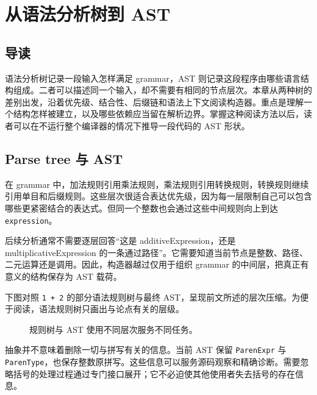 \chapter{从语法分析树到 AST}
\label{chap:front-builder}

\section*{导读}
语法分析树记录一段输入怎样满足 grammar，AST 则记录这段程序由哪些语言结构组成。二者可以描述同一个输入，却不需要有相同的节点层次。本章从两种树的差别出发，沿着优先级、结合性、后缀链和语法上下文阅读构造器。重点是理解一个结构怎样被建立，以及哪些依赖应当留在解析边界。掌握这种阅读方法以后，读者可以在不运行整个编译器的情况下推导一段代码的 AST 形状。

\section{Parse tree 与 AST}
在 grammar 中，加法规则引用乘法规则，乘法规则引用转换规则，转换规则继续引用单目和后缀规则。这些层次很适合表达优先级，因为每一层限制自己可以包含哪些更紧密结合的表达式。但同一个整数也会通过这些中间规则向上到达 \texttt{expression}。

后续分析通常不需要逐层回答“这是 additiveExpression，还是 multiplicativeExpression 的一条通过路径”。它需要知道当前节点是整数、路径、二元运算还是调用。因此，构造器越过仅用于组织 grammar 的中间层，把真正有意义的结构保存为 AST 载荷。

下图对照 \texttt{1 + 2} 的部分语法规则树与最终 AST，呈现前文所述的层次压缩。为便于阅读，语法规则树只画出与论点有关的层级。
\begin{figure}[htbp]
\centering
{}
\caption{规则树与 AST 使用不同层次服务不同任务。}
\end{figure}
抽象并不意味着删除一切与拼写有关的信息。当前 AST 保留 \texttt{ParenExpr} 与 \texttt{ParenType}，也保存整数原拼写。这些信息可以服务源码观察和精确诊断。需要忽略括号的处理过程通过专门接口展开；它不必迫使其他使用者失去括号的存在信息。

